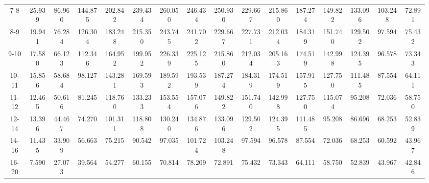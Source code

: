 \documentclass[11pt]{article}
\begin{document}
\begin{table}
\begin{adjustbox}{max width=\textwidth}
\begin{tabular}{c||ccccccccccccccc}
      7-8 & 25.939 & 86.960 & 144.875 & 202.842 & 239.434 & 260.050 & 246.434 & 250.930 & 229.667 & 215.860 & 187.274 & 149.822 & 133.096 & 103.248 & 72.891\\
      8-9 & 19.941 & 76.284 & 126.304 & 183.248 & 215.350 & 243.745 & 241.702 & 229.667 & 227.731 & 212.034 & 184.319 & 151.740 & 129.502 & 97.594 & 75.432\\
      9-10 & 17.580 & 66.123 & 112.346 & 164.952 & 199.952 & 226.339 & 225.125 & 215.860 & 212.034 & 205.163 & 174.519 & 142.998 & 124.395 & 96.578 & 73.343\\
      10-11 & 15.856 & 58.684 & 98.127 & 143.281 & 169.593 & 189.592 & 193.539 & 187.274 & 184.319 & 174.519 & 157.915 & 127.750 & 111.485 & 87.554 & 64.111\\
      11-12 & 12.465 & 50.616 & 81.245 & 118.760 & 133.233 & 153.554 & 157.076 & 149.822 & 151.740 & 142.998 & 127.750 & 115.074 & 95.208 & 72.036 & 58.750\\
      12-14 & 13.396 & 44.467 & 74.270 & 101.311 & 118.808 & 130.240 & 134.876 & 133.096 & 129.502 & 124.395 & 111.485 & 95.208 & 86.696 & 68.253 & 52.839\\
      14-16 & 11.435 & 33.909 & 56.663 & 75.215 & 90.542 & 97.035 & 101.724 & 103.248 & 97.594 & 96.578 & 87.554 & 72.036 & 68.253 & 60.592 & 43.967\\
      16-20 & 7.590 & 27.073 & 39.564 & 54.277 & 60.155 & 70.814 & 78.209 & 72.891 & 75.432 & 73.343 & 64.111 & 58.750 & 52.839 & 43.967 & 42.846
    \end{tabular}
  \end{adjustbox}
  \label{tbl:syscov_thetamu_deg_scintillator}
\end{table}
\end{document}
